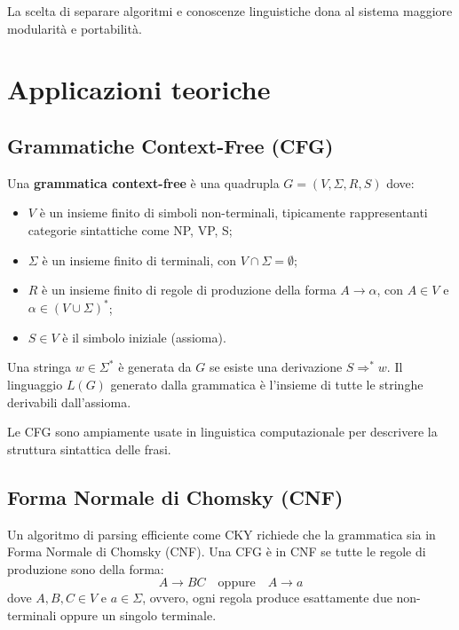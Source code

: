 \documentclass[12pt, a4paper]{article}
\begin{document}
La scelta di separare algoritmi e conoscenze linguistiche dona al sistema maggiore modularità e portabilità.
\section{Applicazioni teoriche}

\subsection{Grammatiche Context-Free (CFG)}

Una \textbf{grammatica context-free} è una quadrupla $G = (V, \Sigma, R, S)$ dove:
\begin{itemize}
    \item $V$ è un insieme finito di simboli non-terminali,
          tipicamente rappresentanti categorie sintattiche come NP, VP, S;
    \item $\Sigma$ è un insieme finito di terminali,
          con $V \cap \Sigma = \emptyset$;
    \item $R$ è un insieme finito di regole di produzione della forma
          $A \rightarrow \alpha$, con $A \in V$ e $\alpha \in (V \cup \Sigma)^*$;
    \item $S \in V$ è il simbolo iniziale (assioma).
\end{itemize}

Una stringa $w \in \Sigma^*$ è generata da $G$ se esiste una derivazione
$S \Rightarrow^* w$. Il linguaggio $L(G)$ generato dalla grammatica è l'insieme di
tutte le stringhe derivabili dall'assioma.

Le CFG sono ampiamente usate in linguistica computazionale per descrivere la
struttura sintattica delle frasi.

\subsection{Forma Normale di Chomsky (CNF)}

Un algoritmo di parsing efficiente come CKY richiede che la grammatica sia in
Forma Normale di Chomsky (CNF). Una CFG è in CNF se tutte le regole
di produzione sono della forma:
\[
    A \rightarrow BC \quad \text{oppure} \quad A \rightarrow a
\]
dove $A, B, C \in V$ e $a \in \Sigma$, ovvero, ogni regola produce
esattamente due non-terminali oppure un singolo terminale.
\end{document}
